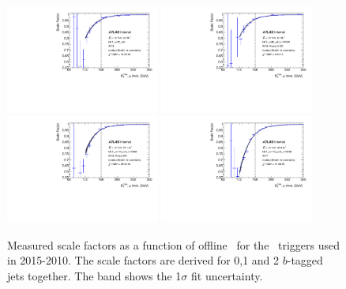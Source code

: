 \begin{figure}[tb!]
	\centering
	\includegraphics[width=0.45\textwidth]{chapters/c6/figures/METTriggerCalibration/SF_HLT_xe70_mht.pdf}
	\includegraphics[width=0.45\textwidth]{chapters/c6/figures/METTriggerCalibration/SF_HLT_xe90_mht_L1XE50.pdf}
	\includegraphics[width=0.45\textwidth]{chapters/c6/figures/METTriggerCalibration/SF_HLT_xe110_mht_L1XE50.pdf}
	\includegraphics[width=0.45\textwidth]{chapters/c6/figures/METTriggerCalibration/SF_HLT_xe110_pufit_L1XE55.pdf}
	\caption{Measured scale factors as a function of offline \METnomu~for the \MET~triggers used in 2015-2010. The scale factors are derived for 0,1 and 2 $b$-tagged jets together. The band shows the 1$\sigma$ fit uncertainty.}
	\label{fig:TrigSF}
\end{figure}

